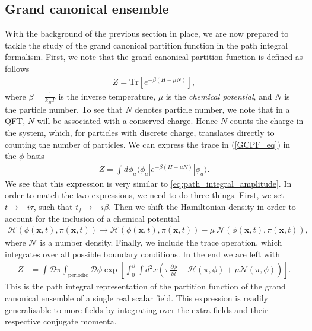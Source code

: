         \subsection{Grand canonical ensemble} \label{GCE_sec}
        With the background of the previous section in place, we are now prepared to tackle the study of the grand canonical partition function in the path integral formalism. First, we note that the grand canonical partition function is defined as follows
        \begin{align}
            Z= \mathrm{Tr} \left[e^{-\beta \left( H - \mu N \right)}\right], \label{GCPF_eq}
        \end{align}
        where $\beta = \frac{1}{k_{B} T}$ is the inverse temperature, $\mu$ is the \textit{chemical potential}, and $N$ is the particle number. To see that $N$ denotes particle number, we note that in a QFT, $N$ will be associated with a conserved charge. Hence $N$ counts the charge in the system, which, for particles with discrete charge, translates directly to counting the number of particles. We can express the trace in (\ref{GCPF_eq}) in the $\phi$ basis
        \begin{align}
            Z= \int d \phi_a \langle \phi_a | e^{-\beta \left( H - \mu N \right)} | \phi_a \rangle.
        \end{align}
        We see that this expression is very similar to \ref{eq:path_integral_amplitude}. In order to match the two expressions, we need to do three things. First, we set $t \rightarrow -i \tau$, such that $t_f \rightarrow -i \beta$. Then we shift the Hamiltonian density in order to account for the inclusion of a chemical potential
        \begin{align}
            \mathcal{H} \left(\phi(\bm{x},t),\pi (\bm{x},t) \right) \rightarrow \mathcal{H}\left(\phi(\bm{x},t),\pi (\bm{x},t) \right) - \mu \ \mathcal{N}\left(\phi(\bm{x},t),\pi (\bm{x},t) \right),
        \end{align}
        where $\mathcal{N}$ is a number density. Finally, we include the trace operation, which integrates over all possible boundary conditions. In the end we are left with
        \begin{align}
            Z &= \int \mathcal{D} \pi \int_{\text{periodic}} \mathcal{D} \phi \exp \left[ \int_0^{\beta} \int d^2x \left(\pi \frac{\partial \phi}{\partial t} - \mathcal{H}(\pi, \phi) + \mu \mathcal{N}(\pi, \phi) \right) \right] \label{eq:partition_function}.
        \end{align}
This is the path integral representation of the partition function of the grand canonical ensemble of a single real scalar field. This expression is readily generalisable to more fields by integrating over the extra fields and their respective conjugate momenta.

